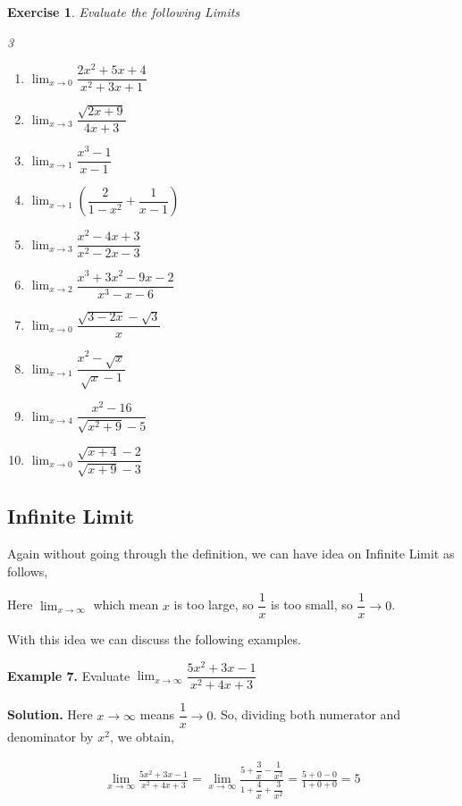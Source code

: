 \documentclass[../../main.tex]{subfiles}
\newtheorem{exercise}{Exercise}[section]
\begin{document}
\begin{exercise}
Evaluate the following Limits
\begin{multicols}{3}
\begin{enumerate}
    \item $\lim_{x \rightarrow 0}\dfrac{2x^2+5x+4}{x^2+3x+1}$
    \item $\lim_{x \rightarrow 3}\dfrac{\sqrt{2x+9}}{4x+3}$
    \item $\lim_{x \rightarrow 1}\dfrac{x^3-1}{x-1}$
    \item $\lim_{x \rightarrow 1}(\dfrac{2}{1-x^2}+\dfrac{1}{x-1})$
    \item $\lim_{x \rightarrow 3}\dfrac{x^2-4x+3}{x^2-2x-3}$
    \item $\lim_{x \rightarrow 2}\dfrac{x^3+3x^2-9x-2}{x^3-x-6}$
    \item $\lim_{x \rightarrow 0}\dfrac{\sqrt{3-2x}-\sqrt{3}}{x}$
    \item $\lim_{x \rightarrow 1}\dfrac{x^2-\sqrt{x}}{\sqrt{x}-1}$
    \item $\lim_{x \rightarrow 4}\dfrac{x^2-16}{\sqrt{x^2+9}-5}$
    \item $\lim_{x \rightarrow 0}\dfrac{\sqrt{x+4}-2}{\sqrt{x+9}-3}$
\end{enumerate}
\end{multicols}
\end{exercise}

\subsection{Infinite Limit}
Again without going through the definition, we can have idea on Infinite Limit as follows, 

Here $\lim_{x \rightarrow \infty}$ which mean $x$ is too large, so $\dfrac{1}{x}$ is too small, so $\dfrac{1}{x}\rightarrow 0$.

With this idea we can discuss the following examples.

\vspace{0.2cm}
\textbf{Example 7.} 
\vspace{0.2cm}
Evaluate $\lim_{x \rightarrow \infty}\dfrac{5x^2+3x-1}{x^2+4x+3}$
    
\textbf{Solution.} Here $x\rightarrow\infty$ means $\dfrac{1}{x}\rightarrow 0$. So, dividing both numerator and denominator by $x^2$, we obtain,

\begin{align*}
    \lim_{x \rightarrow \infty}\frac{5x^2+3x-1}{x^2+4x+3} = \lim_{x \rightarrow \infty}\frac{5+\dfrac{3}{x}-\dfrac{1}{x^2}}{1+\dfrac{4}{x}+\dfrac{3}{x^2}}
    = \frac{5+0-0}{1+0+0} = 5
\end{align*}
\end{document}
